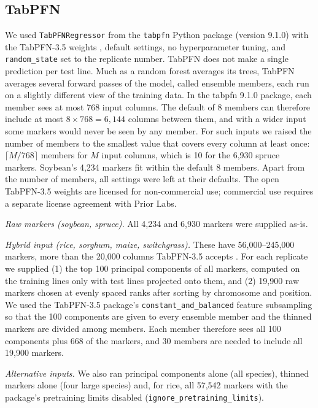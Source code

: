 \documentclass[11pt]{article}
\begin{document}
\subsection{TabPFN}

We used \texttt{TabPFNRegressor} from the \texttt{tabpfn} Python package (version 9.1.0) with the TabPFN-3.5 weights \citep{priorlabs2026b}, default settings, no hyperparameter tuning, and \texttt{random\_state} set to the replicate number. TabPFN does not make a single prediction per test line. Much as a random forest averages its trees, TabPFN averages several forward passes of the model, called ensemble members, each run on a slightly different view of the training data. In the tabpfn 9.1.0 package, each member sees at most 768 input columns. The default of 8 members can therefore include at most $8 \times 768 = 6{,}144$ columns between them, and with a wider input some markers would never be seen by any member. For such inputs we raised the number of members to the smallest value that covers every column at least once: $\lceil M/768 \rceil$ members for $M$ input columns, which is 10 for the 6,930 spruce markers. Soybean's 4,234 markers fit within the default 8 members. Apart from the number of members, all settings were left at their defaults. The open TabPFN-3.5 weights are licensed for non-commercial use; commercial use requires a separate license agreement with Prior Labs.

\emph{Raw markers (soybean, spruce).} All 4,234 and 6,930 markers were supplied as-is.

\emph{Hybrid input (rice, sorghum, maize, switchgrass).} These have 56,000--245,000 markers, more than the 20,000 columns TabPFN-3.5 accepts \citep{priorlabs2026c}. For each replicate we supplied (1) the top 100 principal components of all markers, computed on the training lines only with test lines projected onto them, and (2) 19,900 raw markers chosen at evenly spaced ranks after sorting by chromosome and position. We used the TabPFN-3.5 package's \texttt{constant\_and\_balanced} feature subsampling so that the 100 components are given to every ensemble member and the thinned markers are divided among members. Each member therefore sees all 100 components plus 668 of the markers, and 30 members are needed to include all 19,900 markers.

\emph{Alternative inputs.} We also ran principal components alone (all species), thinned markers alone (four large species) and, for rice, all 57,542 markers with the package's pretraining limits disabled (\texttt{ignore\_\allowbreak{}pretraining\_\allowbreak{}limits}).
\end{document}
